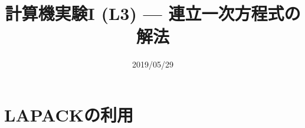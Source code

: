\documentclass[dvipdfmx]{beamer}
\title{計算機実験I (L3) --- 連立一次方程式の解法}
\date{2019/05/29}
\begin{document}
\begin{frame}
  \titlepage
  \tableofcontents
\end{frame}




\section{LAPACKの利用}













\end{document}

